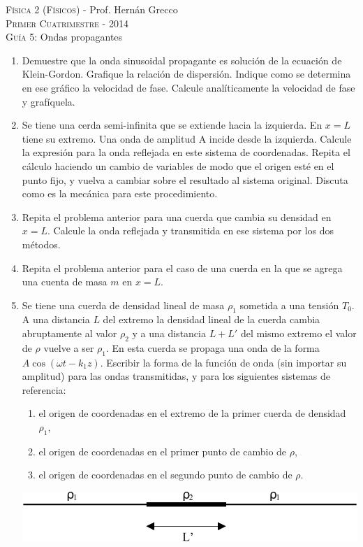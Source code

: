 \documentclass[11pt,spanish,a4paper]{article}
\begin{document}
\begin{center}
	\textsc{\large Física 2 (Físicos)} - Prof. Hernán Grecco\\
	\textsc{\large Primer Cuatrimestre - 2014}\\
	\textsc{\large Guía 5:}	Ondas propagantes
\end{center}

\begin{enumerate}
\item Demuestre que la onda sinusoidal propagante es solución de la ecuación de Klein-Gordon.
	Grafique la relación de dispersión.
	Indique como se determina en ese gráfico la velocidad de fase.
	Calcule analíticamente la velocidad de fase y grafíquela.


\item Se tiene una cerda semi-infinita que se extiende hacia la izquierda.
	En \(x=L\) tiene su extremo.
	Una onda de amplitud A incide desde la izquierda.
	Calcule la expresión para la onda reflejada en este sistema de coordenadas.
	Repita el cálculo haciendo un cambio de variables de modo que el origen esté en el punto fijo, y vuelva a cambiar sobre el resultado al sistema original.
	Discuta como es la mecánica para este procedimiento.


\item Repita el problema anterior para una cuerda que cambia su densidad en \(x=L\).
	Calcule la onda reflejada y transmitida en ese sistema por los dos métodos.


\item Repita el problema anterior para el caso de una cuerda en la que se agrega una cuenta de masa \(m\) en \(x=L\).


\item Se tiene una cuerda de densidad lineal de masa \(\rho_1\) sometida a una tensión \(T_0\).
	A una distancia \(L\) del extremo la densidad lineal de la cuerda cambia abruptamente al valor \(\rho_2\) y a una distancia \(L+L'\) del mismo extremo el valor de \(\rho\) vuelve a ser \(\rho_1\).
	En esta cuerda se propaga una onda de la forma \(A \cos{(\omega t- k_1 z)}\).
	Escribir la forma de la función de onda (sin importar su amplitud) para las ondas transmitidas, y para los siguientes sistemas de referencia:
	\begin{enumerate}
		\item el origen de coordenadas en el extremo de la primer cuerda de densidad \(\rho_1\), 
		\item el origen de coordenadas en el primer punto de cambio de \(\rho\), 
		\item el origen de coordenadas en el segundo punto de cambio de \(\rho\).
	\end{enumerate}
\begin{center}
	\includegraphics[width=0.45\linewidth]{g05e05}
\end{center}



\end{enumerate}
\end{document}
